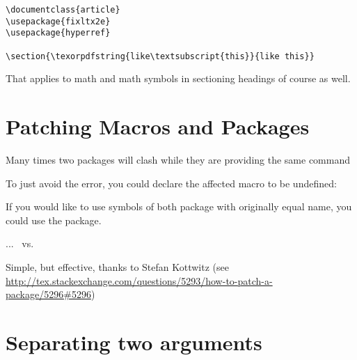 
\begin{Verbatim}
\documentclass{article}
\usepackage{fixltx2e}
\usepackage{hyperref}

\section{\texorpdfstring{like\textsubscript{this}}{like this}}

\end{Verbatim}

That applies to math and math symbols in sectioning headings of course as well.

\section{Patching Macros and Packages}

Many times two packages will clash while they are providing the same command

To just avoid the error, you could declare the affected macro to be undefined:

\begin{teX}
\usepackage{eurosym}
\let\EUR\undefined
\usepackage{marvosym}
\end{teX}

If you would like to use symbols of both package with originally equal name, you could use the  package.

\begin{teX}
\usepackage{savesym}
\usepackage{eurosym}
\usepackage{marvosym}
...
\EUR\ vs. \marvosymEUR
\end{teX}

Simple, but effective, thanks to Stefan Kottwitz (see \url{http://tex.stackexchange.com/questions/5293/how-to-patch-a-package/5296#5296})


\section*{Separating two arguments}

